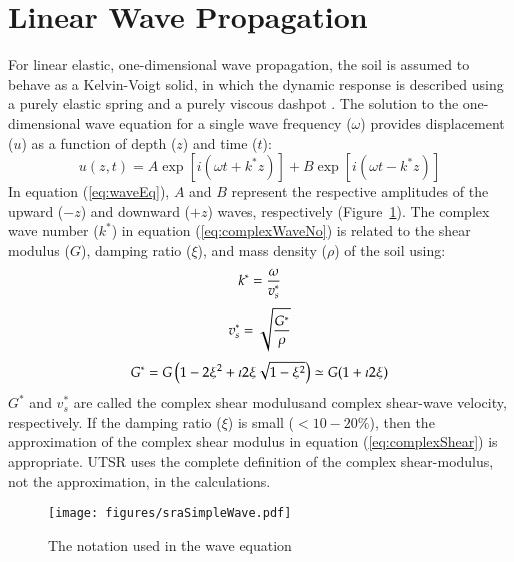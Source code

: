 \documentclass[11pt]{report}
\begin{document}
\section{Linear Wave Propagation}\label{ch:sra:waveProp}
For linear elastic, one-dimensional wave propagation, the soil is assumed to behave as a
Kelvin-Voigt solid, in which the dynamic response is described using a purely elastic spring and a
purely viscous dashpot \citep{kramer:96}.  The solution to the one-dimensional wave
equation for a single wave frequency ($\omega$) provides displacement ($u$) as
a function of depth ($z$) and time ($t$):
\begin{equation}
  u(z,t) = A\exp\left[i\left( \omega t + k^* z \right)\right] + B\exp\left[i\left( \omega t - k^* z
  \right)\right] 
  \label{eq:waveEq}
\end{equation}
In equation (\ref{eq:waveEq}), $A$ and $B$ represent the respective amplitudes of the upward ($-z$)
and downward ($+z$) waves, respectively (Figure~\ref{fig:sraSimpleWave}).  The complex wave number
($k^*$) in equation (\ref{eq:complexWaveNo}) is related to the shear modulus ($G$), damping ratio
($\xi$), and mass density ($\rho$) of the soil using:
\begin{equation}
 	k^* 	= \frac{\omega}{v_s^*} \\
	\label{eq:complexWaveNo}
\end{equation}
\begin{equation}
	v_s^*	= \sqrt{ \frac{G^*}{\rho} } \\
\end{equation}
\begin{equation}
	G^* 	= G \left( 1 - 2\xi^2 + \imath 2 \xi \sqrt{ 1 - \xi^2 }\right) 
		\simeq G ( 1 + \imath 2 \xi ) \\
	\label{eq:complexShear}
\end{equation}
$G^*$ and $v_s^*$ are called the complex shear modulusand complex
shear-wave velocity, respectively.  If the damping ratio ($\xi$) is small ($<10-20\%$), then the
approximation of the complex shear modulus in equation (\ref{eq:complexShear}) is appropriate.  UTSR
uses the complete definition of the complex shear-modulus, not the approximation, in the
calculations.

\begin{figure}[tb]
  \begin{center}
	\texttt{[image: figures/sraSimpleWave.pdf]}
  \end{center}
  \caption{The notation used in the wave equation}
  \label{fig:sraSimpleWave}
\end{figure}
\end{document}
